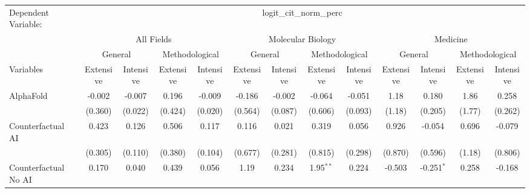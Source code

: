 \begingroup
\centering
\begin{tabular}{lcccccccccccc}
   \tabularnewline \midrule \midrule
   Dependent Variable: & \multicolumn{12}{c}{logit\_cit\_norm\_perc}\\
 & \multicolumn{4}{c}{All Fields} & \multicolumn{4}{c}{Molecular Biology} & \multicolumn{4}{c}{Medicine} \\
\cmidrule(lr){2-5} \cmidrule(lr){6-9} \cmidrule(lr){10-13}
 & \multicolumn{2}{c}{General} & \multicolumn{2}{c}{Methodological} & \multicolumn{2}{c}{General} & \multicolumn{2}{c}{Methodological} & \multicolumn{2}{c}{General} & \multicolumn{2}{c}{Methodological} \\
\cmidrule(lr){2-3} \cmidrule(lr){4-5} \cmidrule(lr){6-7} \cmidrule(lr){8-9} \cmidrule(lr){10-11} \cmidrule(lr){12-13}
Variables & \multicolumn{1}{c}{Extensive} & \multicolumn{1}{c}{Intensive} & \multicolumn{1}{c}{Extensive} & \multicolumn{1}{c}{Intensive} & \multicolumn{1}{c}{Extensive} & \multicolumn{1}{c}{Intensive} & \multicolumn{1}{c}{Extensive} & \multicolumn{1}{c}{Intensive} & \multicolumn{1}{c}{Extensive} & \multicolumn{1}{c}{Intensive} & \multicolumn{1}{c}{Extensive} & \multicolumn{1}{c}{Intensive} \\
\cmidrule(lr){1-1}\cmidrule(lr){2-2} \cmidrule(lr){3-3} \cmidrule(lr){4-4} \cmidrule(lr){5-5} \cmidrule(lr){6-6} \cmidrule(lr){7-7} \cmidrule(lr){8-8} \cmidrule(lr){9-9} \cmidrule(lr){10-10} \cmidrule(lr){11-11} \cmidrule(lr){12-12} \cmidrule(lr){13-13}
   AlphaFold                                & -0.002  & -0.007        & 0.196   & -0.009         & -0.186  & -0.002  & -0.064      & -0.051  & 1.18    & 0.180        & 1.86   & 0.258\\   
                                            & (0.360) & (0.022)       & (0.424) & (0.020)        & (0.564) & (0.087) & (0.606)     & (0.093) & (1.18)  & (0.205)      & (1.77) & (0.262)\\   
   Counterfactual AI                        & 0.423   & 0.126         & 0.506   & 0.117          & 0.116   & 0.021   & 0.319       & 0.056   & 0.926   & -0.054       & 0.696  & -0.079\\   
                                            & (0.305) & (0.110)       & (0.380) & (0.104)        & (0.677) & (0.281) & (0.815)     & (0.298) & (0.870) & (0.596)      & (1.18) & (0.806)\\   
   Counterfactual No AI                     & 0.170   & 0.040         & 0.439   & 0.056          & 1.19    & 0.234   & 1.95$^{**}$ & 0.224   & -0.503  & -0.251$^{*}$ & 0.258  & -0.168\\   

\end{tabular}
